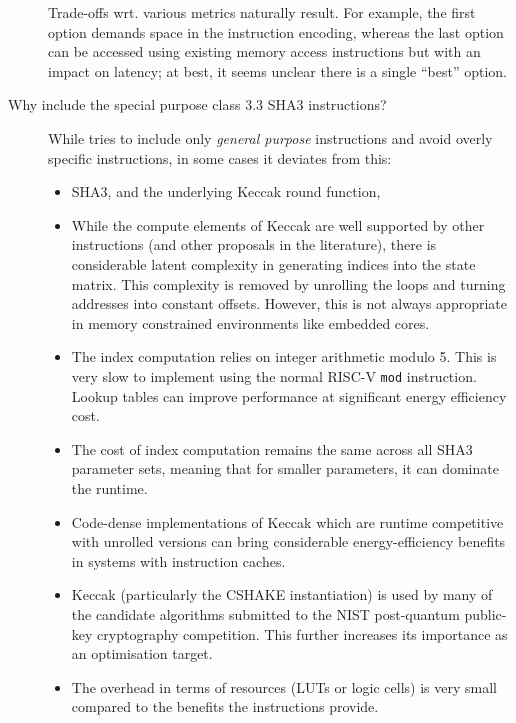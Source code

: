 \begin{description}
      \noindent
      Trade-offs wrt. various metrics naturally result.  For example,
      the first option demands space in the instruction encoding, 
      whereas
      the last  option can be accessed using existing memory access instructions but with an impact on latency;
      at best, it seems unclear there is a single ``best'' option.

\item[Why include the special purpose class $3.3$ SHA3 instructions?]
      While \XCID tries to include only {\em general purpose} instructions and
      avoid overly specific instructions, in some cases it deviates from this:

      \begin{itemize}
      \item SHA3, and the underlying Keccak round function,
      \item While the compute elements of Keccak are well supported by other
            \XCID instructions (and other proposals in the literature), there
            is considerable latent complexity in generating indices into
            the state matrix.
            This complexity is removed by unrolling the loops and
            turning addresses into constant offsets. However, this is not
            always appropriate in memory constrained environments like embedded
            cores.
      \item The index computation relies on integer arithmetic modulo 5. This
            is very slow to implement using the normal RISC-V {\tt mod} instruction.
            Lookup tables can improve performance at significant energy efficiency cost.
      \item The cost of index computation remains the same across all SHA3 parameter
            sets, meaning that for smaller parameters, it can dominate the runtime.
      \item Code-dense implementations of Keccak which are runtime competitive
            with unrolled versions can bring considerable energy-efficiency
            benefits in systems with instruction caches.
      \item Keccak (particularly the CSHAKE instantiation) is used by many of the
            candidate algorithms submitted to the NIST post-quantum public-key
            cryptography competition. This further increases its importance as
            an optimisation target.
      \item The overhead in terms of resources (LUTs or logic cells) is very
            small compared to the benefits the instructions provide.
      \end{itemize}

\end{description}

